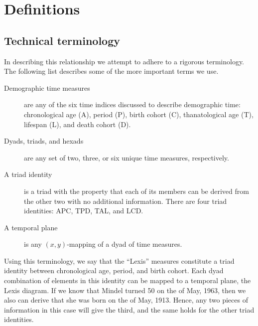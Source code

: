 \documentclass[12pt,oneside,a4paper]{article} %
\begin{document}
\section{Definitions}
\subsection{Technical terminology}
In describing this relationship we attempt to adhere to a rigorous
terminology.
The following list describes some of the more important terms we use.
\begin{description}
\item[Demographic time measures] are any of the six time indices discussed to
describe demographic time: chronological age (A), period (P), birth cohort (C), thanatological age (T), lifespan (L), and death cohort (D).
\item[Dyads, triads, and hexads] are any set of two, three, or six unique time
measures, respectively.
\item[A triad identity] is a triad with the property that each of its members
can be derived from the other two with no additional information. There are four triad
identities: APC, TPD, TAL, and LCD.
\item[A temporal plane] is any $(x,y)$-mapping of a dyad of time measures.
\end{description}
Using this terminology, we say that the ``Lexis'' measures
constitute a triad identity between chronological age, period, and birth cohort. Each dyad
combination of elements in this identity can be mapped to a
temporal plane, the Lexis diagram. If we know that Mindel turned 50 on the
 of May, 1963, then we also can derive that she was born on the  of
May, 1913. Hence, any two pieces of information in this case will give the
third, and the same holds for the other triad identities.
\end{document}
